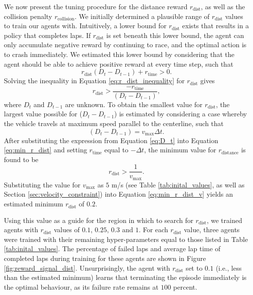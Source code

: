 We now present the tuning procedure for the distance reward $r_{\text{dist}}$, as well as the collision penalty $r_{\text{collision}}$.
We initially determined a plausible range of $r_{\text{dist}}$ values to train our agents with.
Intuitively, a lower bound for $r_{\text{dist}}$ exists that results in a policy that completes laps.
If $r_{\text{dist}}$ is set beneath this lower bound, the agent can only accumulate negative reward by continuing to race, and the optimal action is to crash immediately.
We estimated this lower bound by considering that the agent should be able to achieve positive reward at every time step, such that
\begin{equation}\label{eq:r_dist_inequality}
    r_{\text{dist}}(D_{t} - D_{t-1}) + r_{\text{time}} > 0.
\end{equation}
Solving the inequality in Equation \ref{eq:r_dist_inequality} for $r_{\text{dist}}$ gives
\begin{equation}
    r_{\text{dist}} > \frac{-r_{\text{time}}}{(D_t-D_{t-1})},
\label{eq:min_r_dist}
\end{equation}
where $D_{t}$ and $D_{t-1}$ are unknown.
To obtain the smallest value for $r_{\text{dist}}$, the largest value possible for ($D_{t}-D_{t-1}$) is estimated by considering a case whereby the vehicle  travels at maximum speed parallel to the centerline, such that
\begin{equation}\label{eq:D_t}
    (D_t - D_{t-1}) = v_{\text{max}} \Delta t.
\end{equation}
After substituting the expression from Equation \ref{eq:D_t} into Equation \ref{eq:min_r_dist} and setting $r_{\text{time}}$ equal to $-\Delta t$, 
the minimum value for $r_{\text{distance}}$ is found to be
\begin{equation}\label{eq:min_r_dist_v}
    r_{\text{dist}} > \frac{1}{v_{\text{max}}}.
\end{equation}
Substituting the value for $v_{\text{max}}$ as $5$ m/s (see Table \ref{tab:inital_values}, as well as Section \ref{sec:velocity_constraint}) into Equation \ref{eq:min_r_dist_v} yields an estimated minimum $r_{\text{dist}}$ of $0.2$.


Using this value as a guide for the region in which to search for  $r_{\text{dist}}$, we trained agents with $r_{\text{dist}}$ values of $0.1$, $0.25$, $0.3$ and $1$. 
For each $r_{\text{dist}}$ value, three agents were trained with their remaining hyper-parameters equal to those listed in Table \ref{tab:inital_values}.
The percentage of failed laps and average lap time of completed laps during training for these agents are shown in Figure \ref{fig:reward_signal_dist}.
Unsurprisingly, the agent with $r_{\text{dist}}$ set to $0.1$ (i.e., less than the estimated minimum) learns that terminating the episode immediately is the optimal behaviour, as its failure rate remains at $100$ percent.

